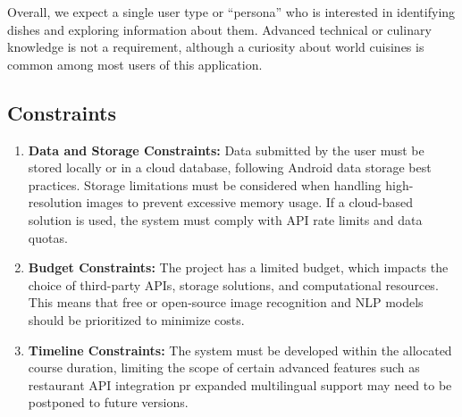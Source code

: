 \documentclass[]{article}
\begin{document}
Overall, we expect a single user type or “persona” who is interested in identifying dishes and exploring information about them. Advanced technical or culinary knowledge is not a requirement, although a curiosity about world cuisines is common among most users of this application.

\subsection{Constraints}
\label{sub:constraints}
\begin{enumerate}
	\item \textbf{Data and Storage Constraints: }Data submitted by the user must be stored locally or in a cloud database, following Android data storage best practices. Storage limitations must be considered when handling high-resolution images to prevent excessive memory usage. If a cloud-based solution is used, the system must comply with API rate limits and data quotas.
	\item \textbf{Budget Constraints: }The project has a limited budget, which impacts the choice of third-party APIs, storage solutions, and computational resources. This means that free or open-source image recognition and NLP models should be prioritized to minimize costs.
	\item \textbf{Timeline Constraints: }The system must be developed within the allocated course duration, limiting the scope of certain advanced features such as restaurant API integration pr expanded multilingual support may need to be postponed to future versions.
\end{enumerate}
\end{document}
